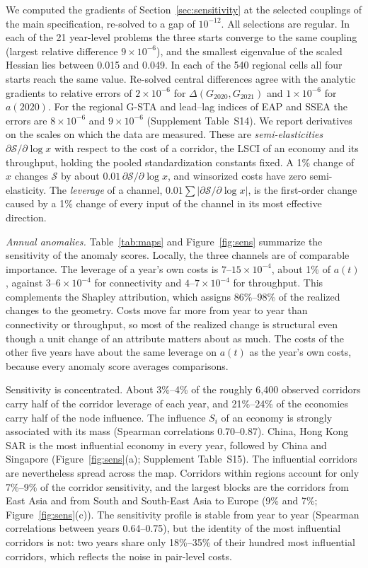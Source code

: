 We computed the gradients of Section~\ref{sec:sensitivity} at the selected couplings of the main specification, re-solved to a gap of $10^{-12}$. All selections are regular. In each of the 21 year-level problems the three starts converge to the same coupling (largest relative difference $9\times10^{-6}$), and the smallest eigenvalue of the scaled Hessian lies between 0.015 and 0.049. In each of the 540 regional cells all four starts reach the same value. Re-solved central differences agree with the analytic gradients to relative errors of $2\times10^{-6}$ for $\Delta(G_{2020},G_{2021})$ and $1\times10^{-6}$ for $a(2020)$. For the regional G-STA and lead--lag indices of EAP and SSEA the errors are $8\times10^{-6}$ and $9\times10^{-6}$ (Supplement Table~S14). We report derivatives on the scales on which the data are measured. These are \emph{semi-elasticities} $\partial\mathcal S/\partial\log x$ with respect to the cost of a corridor, the LSCI of an economy and its throughput, holding the pooled standardization constants fixed. A 1\% change of $x$ changes $\mathcal S$ by about $0.01\,\partial\mathcal S/\partial\log x$, and winsorized costs have zero semi-elasticity. The \emph{leverage} of a channel, $0.01\sum|\partial\mathcal S/\partial\log x|$, is the first-order change caused by a 1\% change of every input of the channel in its most effective direction.

\emph{Annual anomalies.} Table~\ref{tab:maps} and Figure~\ref{fig:sens} summarize the sensitivity of the anomaly scores. Locally, the three channels are of comparable importance. The leverage of a year's own costs is $7$--$15\times10^{-4}$, about 1\% of $a(t)$, against $3$--$6\times10^{-4}$ for connectivity and $4$--$7\times10^{-4}$ for throughput. This complements the Shapley attribution, which assigns 86\%--98\% of the realized changes to the geometry. Costs move far more from year to year than connectivity or throughput, so most of the realized change is structural even though a unit change of an attribute matters about as much. The costs of the other five years have about the same leverage on $a(t)$ as the year's own costs, because every anomaly score averages comparisons.

Sensitivity is concentrated. About 3\%--4\% of the roughly 6{,}400 observed corridors carry half of the corridor leverage of each year, and 21\%--24\% of the economies carry half of the node influence. The influence $S_i$ of an economy is strongly associated with its mass (Spearman correlations 0.70--0.87). China, Hong Kong SAR is the most influential economy in every year, followed by China and Singapore (Figure~\ref{fig:sens}(a); Supplement Table~S15). The influential corridors are nevertheless spread across the map. Corridors within regions account for only 7\%--9\% of the corridor sensitivity, and the largest blocks are the corridors from East Asia and from South and South-East Asia to Europe (9\% and 7\%; Figure~\ref{fig:sens}(c)). The sensitivity profile is stable from year to year (Spearman correlations between years 0.64--0.75), but the identity of the most influential corridors is not: two years share only 18\%--35\% of their hundred most influential corridors, which reflects the noise in pair-level costs.

